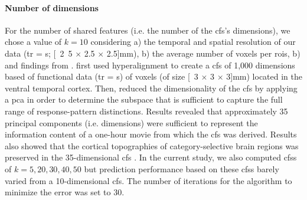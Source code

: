 \paragraph{Number of dimensions}



%
%

For the number of shared features (i.e. the number of the \ac{cfs}'s
dimensions), we chose a value of $k=10$ considering a) the temporal and spatial
resolution of our data (\ac{tr} = \unit[2]{s}; \unit[2.5 $\times$ 2.5 $\times$
2.5]{mm}), b) the average number of voxels per \acp{roi}, b) and findings from
\citet{haxby2011common}.
%
\citet{haxby2011common} first used hyperalignment to create a \ac{cfs} of 1,000
dimensions based of functional data (\ac{tr} = \unit[3]{s}) of voxels (of size
\unit[3 $\times$ 3 $\times$ 3]{mm}) located in the ventral temporal cortex.
%
Then, \citet{haxby2011common} reduced the dimensionality of the \ac{cfs} by
applying a \ac{pca} in order to determine the subspace that is sufficient to
capture the full range of response-pattern distinctions.
%
Results revealed that approximately 35 principal components (i.e. dimensions)
were sufficient to represent the information content of a one-hour movie from
which the \ac{cfs} was derived.
%
Results also showed that the cortical topographies of category-selective brain
regions was preserved in the 35-dimensional \ac{cfs} \citep{haxby2011common}.
%
In the current study, we also computed \acp{cfs} of $k=5, 20, 30, 40, 50$ but
prediction performance based on these \acp{cfs} barely varied from a
10-dimensional \ac{cfs}.
The number of iterations for the algorithm to minimize the error was set to 30.



